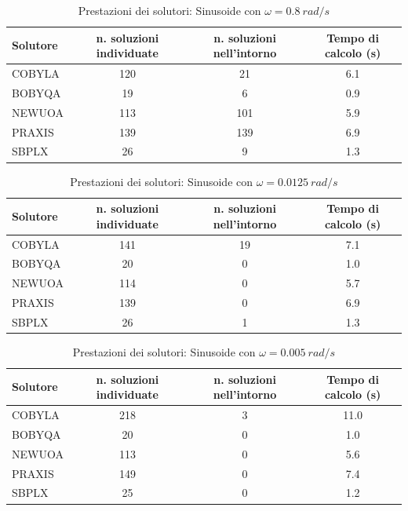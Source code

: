 \documentclass[a4paper,12pt]{report}
\begin{document}
\begin{table}[H]
  \caption{Prestazioni dei solutori: Sinusoide con $\omega = 0.8~rad/s$}
  \label{tab:prestazioni_sol8}
  \center
    \begin{tabular}{lSSS}
      \toprule
      {Solutore} & {n. soluzioni individuate} & {n. soluzioni nell'intorno} & {Tempo di calcolo (s)} \\
      \midrule
      COBYLA & 120 & 21 & 6.1 \\
      BOBYQA & 19   &     6     &  0.9   \\
      NEWUOA & 113  &    101    &  5.9 \\
      PRAXIS & 139  &    139    &  6.9 \\
      SBPLX  & 26    &     9    &  1.3 \\
      \bottomrule
    \end{tabular}
\end{table}

\begin{table}[H]
  \caption{Prestazioni dei solutori: Sinusoide con $\omega = 0.0125~rad/s$}
  \label{tab:prestazioni_sol0125}
  \center
    \begin{tabular}{lSSS}
      \toprule
      {Solutore} & {n. soluzioni individuate} & {n. soluzioni nell'intorno} & {Tempo di calcolo (s)} \\
      \midrule
      COBYLA & 141  &    19     &  7.1 \\
      BOBYQA & 20   &     0     &   1.0 \\
      NEWUOA & 114   &     0    &   5.7 \\
      PRAXIS & 139   &     0     &  6.9 \\
      SBPLX  & 26   &     1     &   1.3 \\
      \bottomrule
    \end{tabular}
\end{table}

\begin{table}
  \caption{Prestazioni dei solutori: Sinusoide con $\omega = 0.005~rad/s$}
  \label{tab:prestazioni_sol005}
  \center
    \begin{tabular}{lSSS}
      \toprule
      {Solutore} & {n. soluzioni individuate} & {n. soluzioni nell'intorno} & {Tempo di calcolo (s)} \\
      \midrule
      COBYLA & 218  &     3     &  11.0 \\
      BOBYQA & 20   &     0     &   1.0 \\
      NEWUOA & 113  &     0     &   5.6 \\
      PRAXIS & 149  &     0     &  7.4 \\
      SBPLX & 25   &     0     &   1.2 \\
      \bottomrule
    \end{tabular}
\end{table}
\end{document}
